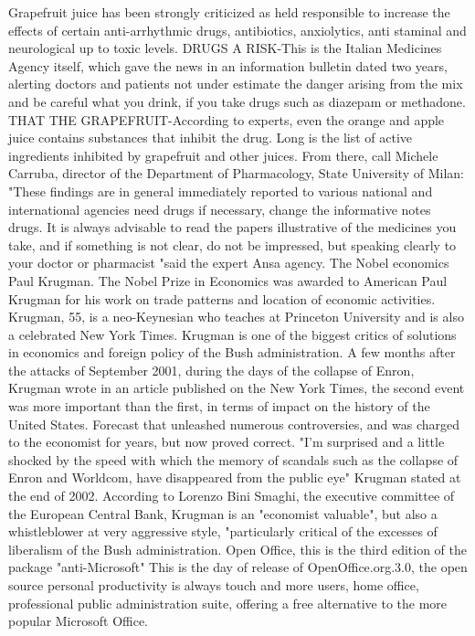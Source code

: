 Grapefruit juice has been strongly criticized as held responsible to increase the effects of certain anti-arrhythmic drugs, antibiotics, anxiolytics, anti staminal and neurological up to toxic levels.
DRUGS A RISK-This is the Italian Medicines Agency itself, which gave the news in an information bulletin dated two years, alerting doctors and patients not under estimate the danger arising from the mix and be careful what you drink, if you take drugs such as diazepam or methadone.
THAT THE GRAPEFRUIT-According to experts, even the orange and apple juice contains substances that inhibit the drug.
Long is the list of active ingredients inhibited by grapefruit and other juices.
From there, call Michele Carruba, director of the Department of Pharmacology, State University of Milan: "These findings are in general immediately reported to various national and international agencies need drugs if necessary, change the informative notes drugs.
It is always advisable to read the papers illustrative of the medicines you take, and if something is not clear, do not be impressed, but speaking clearly to your doctor or pharmacist "said the expert Ansa agency.
The Nobel economics Paul Krugman.
The Nobel Prize in Economics was awarded to American Paul Krugman for his work on trade patterns and location of economic activities.
Krugman, 55, is a neo-Keynesian who teaches at Princeton University and is also a celebrated New York Times.
Krugman is one of the biggest critics of solutions in economics and foreign policy of the Bush administration.
A few months after the attacks of September 2001, during the days of the collapse of Enron, Krugman wrote in an article published on the New York Times, the second event was more important than the first, in terms of impact on the history of the United States.
Forecast that unleashed numerous controversies, and was charged to the economist for years, but now proved correct.
"I'm surprised and a little shocked by the speed with which the memory of scandals such as the collapse of Enron and Worldcom, have disappeared from the public eye" Krugman stated at the end of 2002.
According to Lorenzo Bini Smaghi, the executive committee of the European Central Bank, Krugman is an "economist valuable", but also a whistleblower at very aggressive style, "particularly critical of the excesses of liberalism of the Bush administration.
Open Office, this is the third edition of the package "anti-Microsoft"
This is the day of release of OpenOffice.org.3.0, the open source personal productivity is always touch and more users, home office, professional public administration suite, offering a free alternative to the more popular Microsoft Office.
